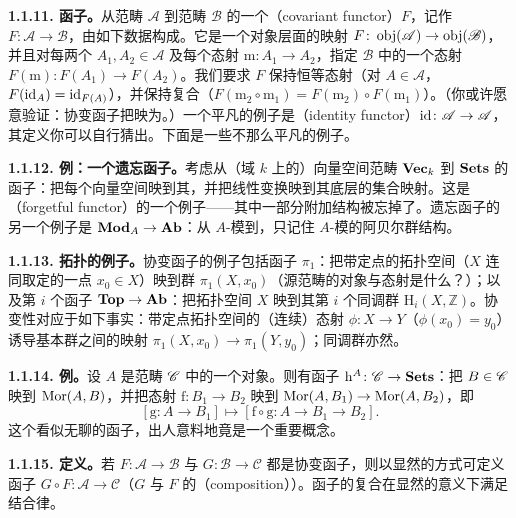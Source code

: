 \textbf{1.1.11. 函子。}\quad 从范畴 $\mathscr{A}$ 到范畴 $\mathscr{B}$ 的一个\textbf{\trCovariantFunctor}（covariant functor）$F$，记作 $F\colon\mathscr{A}\to\mathscr{B}$，由如下数据构成。它是一个对象层面的映射 $F\colon\operatorname{obj}(\mathscr{A})\to\operatorname{obj}(\mathscr{B})$，并且对每两个 $A_1,A_2\in\mathscr{A}$ 及每个态射 $\mathrm{m}\colon A_1\to A_2$，指定 $\mathscr{B}$ 中的一个态射 $F(\mathrm{m})\colon F(A_1)\to F(A_2)$。我们要求 $F$ 保持恒等态射（对 $A\in\mathscr{A}$，$F(\mathrm{id}_A)=\mathrm{id}_{F(A)}$），并保持复合（$F(\mathrm{m}_2\circ\mathrm{m}_1)=F(\mathrm{m}_2)\circ F(\mathrm{m}_1)$）。（你或许愿意验证：协变函子把\trIsomorphism{}映为\trIsomorphism。）一个平凡的例子是\textbf{\trIdFunctor}（identity functor）$\mathrm{id}\colon\mathscr{A}\to\mathscr{A}$，其定义你可以自行猜出。下面是一些不那么平凡的例子。

\textbf{1.1.12. 例：一个遗忘函子。}\quad 考虑从（域 $k$ 上的）向量空间范畴 $\mathbf{Vec}_k$ 到 $\mathbf{Sets}$ 的函子：把每个向量空间映到其\trUnderlyingSet，并把线性变换映到其底层的集合映射。这是\textbf{\trForgetfulFunctor}（forgetful functor）的一个例子——其中一部分附加结构被忘掉了。遗忘函子的另一个例子是 $\mathbf{Mod}_{A}\to\mathbf{Ab}$：从 $A$-模到\trAbelianGroups，只记住 $A$-模的阿贝尔群结构。

\textbf{1.1.13. 拓扑的例子。}\quad 协变函子的例子包括\trFundamentalGroup{}函子 $\pi_1$：把带定点的拓扑空间（$X$ 连同取定的一点 $x_0\in X$）映到群 $\pi_1(X,x_0)$（源范畴的对象与态射是什么？）；以及第 $i$ 个\trHomology{}函子 $\mathbf{Top}\to\mathbf{Ab}$：把拓扑空间 $X$ 映到其第 $i$ 个同调群 $\mathrm{H}_i(X,\mathbb{Z})$。协变性对应于如下事实：带定点拓扑空间的（连续）态射 $\phi\colon X\to Y$（$\phi(x_0)=y_0$）诱导基本群之间的映射 $\pi_1(X,x_0)\to\pi_1(Y,y_0)$；同调群亦然。

\textbf{1.1.14. 例。}\quad 设 $A$ 是范畴 $\mathscr{C}$ 中的一个对象。则有函子 $\mathrm{h}^A\colon\mathscr{C}\to\mathbf{Sets}$：把 $B\in\mathscr{C}$ 映到 $\operatorname{Mor}(A,B)$，并把态射 $\mathrm{f}\colon B_1\to B_2$ 映到 $\operatorname{Mor}(A,B_1)\to\operatorname{Mor}(A,B_2)$，即
\[
[\mathrm{g}\colon A\to B_1] \longmapsto [\mathrm{f}\circ\mathrm{g}\colon A\to B_1\to B_2].
\]
这个看似无聊的函子，出人意料地竟是一个重要概念。

\textbf{1.1.15. 定义。}\quad 若 $F\colon\mathscr{A}\to\mathscr{B}$ 与 $G\colon\mathscr{B}\to\mathscr{C}$ 都是协变函子，则以显然的方式可定义函子 $G\circ F\colon\mathscr{A}\to\mathscr{C}$（$G$ 与 $F$ 的\textbf{\trComposition}（composition））。函子的复合在显然的意义下满足结合律。

